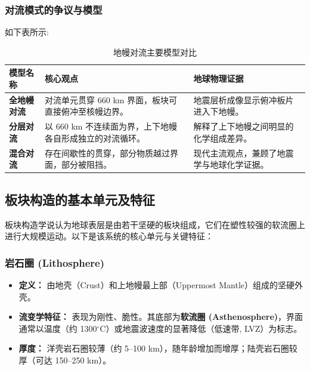 \documentclass[12pt,a4paper]{article}
\begin{document}
	\subsubsection{对流模式的争议与模型}
	如下表所示:
	\begin{table}[htbp]
		\centering
		\caption{地幔对流主要模型对比}
		\label{tab:convection_models}
		\begin{tabularx}{\textwidth}{l X X}
			\toprule
			模型名称 & 核心观点 & 地球物理证据 \\
			\midrule
			\textbf{全地幔对流} & 对流单元贯穿 660 km 界面，板块可直接俯冲至核幔边界。 & 地震层析成像显示俯冲板片进入下地幔。 \\
			\addlinespace
			\textbf{分层对流} & 以 660 km 不连续面为界，上下地幔各自形成独立的对流循环。 & 解释了上下地幔之间明显的化学组成差异。 \\
			\addlinespace
			\textbf{混合对流} & 存在间歇性的贯穿，部分物质越过界面，部分被阻挡。 & 现代主流观点，兼顾了地震学与地球化学证据。 \\
			\bottomrule
		\end{tabularx}
	\end{table}
	
	\subsection{板块构造的基本单元及特征}
	
	板块构造学说认为地球表层是由若干坚硬的板块组成，它们在塑性较强的软流圈上进行大规模运动。以下是该系统的核心单元与关键特征：
	
	\subsubsection{岩石圈 (Lithosphere)}
	\begin{itemize}
		\item \textbf{定义：} 由地壳（Crust）和上地幔最上部（Uppermost Mantle）组成的坚硬外壳。
		\item \textbf{流变学特征：} 表现为刚性、脆性。其底部为\textbf{软流圈 (Asthenosphere)}，界面通常以温度（约 1300$^\circ$C）或地震波速度的显著降低（低速带, LVZ）为标志。
		\item \textbf{厚度：} 洋壳岩石圈较薄（约 5--100 km），随年龄增加而增厚；陆壳岩石圈较厚（可达 150--250 km）。
	\end{itemize}
	
\end{document}
